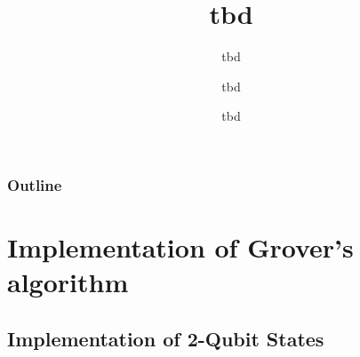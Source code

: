 \documentclass[aspectratio=169]{beamer}
\title{tbd}
\subtitle{tbd}
\date[tbd]{tbd}
\author[jmaunon]{tbd}
\begin{document}
\begin{frame}
\titlepage
\end{frame}


\begin{frame}[plain]
\frametitle{Outline}
\tableofcontents

\end{frame}







\section{Implementation of Grover's algorithm}
\subsection{Implementation of 2-Qubit States}


\end{document}

